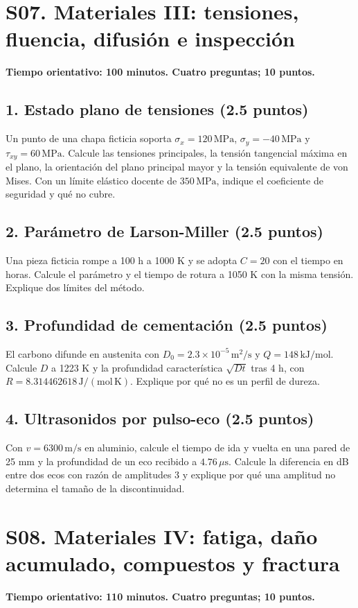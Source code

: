 \chapter{S07. Materiales III: tensiones, fluencia, difusión e inspección}
\noindent\textbf{Tiempo orientativo: 100 minutos. Cuatro preguntas; 10 puntos.}
\section*{1. Estado plano de tensiones (2.5 puntos)}
Un punto de una chapa ficticia soporta $\sigma_x=120\,\mathrm{MPa}$, $\sigma_y=-40\,\mathrm{MPa}$ y $\tau_{xy}=60\,\mathrm{MPa}$. Calcule las tensiones principales, la tensión tangencial máxima en el plano, la orientación del plano principal mayor y la tensión equivalente de von Mises. Con un límite elástico docente de $350\,\mathrm{MPa}$, indique el coeficiente de seguridad y qué no cubre.

\section*{2. Parámetro de Larson-Miller (2.5 puntos)}
Una pieza ficticia rompe a 100 h a 1000 K y se adopta $C=20$ con el tiempo en horas. Calcule el parámetro y el tiempo de rotura a 1050 K con la misma tensión. Explique dos límites del método.

\section*{3. Profundidad de cementación (2.5 puntos)}
El carbono difunde en austenita con $D_0=2.3\times10^{-5}\,\mathrm{m^2/s}$ y $Q=148\,\mathrm{kJ/mol}$. Calcule $D$ a 1223 K y la profundidad característica $\sqrt{Dt}$ tras 4 h, con $R=8.314462618\,\mathrm{J/(mol\,K)}$. Explique por qué no es un perfil de dureza.

\section*{4. Ultrasonidos por pulso-eco (2.5 puntos)}
Con $v=6300\,\mathrm{m/s}$ en aluminio, calcule el tiempo de ida y vuelta en una pared de 25 mm y la profundidad de un eco recibido a $4.76\,\mu\mathrm s$. Calcule la diferencia en dB entre dos ecos con razón de amplitudes 3 y explique por qué una amplitud no determina el tamaño de la discontinuidad.

\chapter{S08. Materiales IV: fatiga, daño acumulado, compuestos y fractura}
\noindent\textbf{Tiempo orientativo: 110 minutos. Cuatro preguntas; 10 puntos.}

